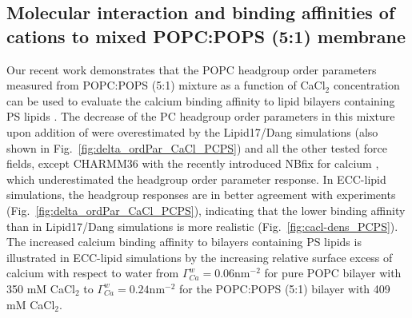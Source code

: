 \documentclass[journal=jpcbfk,manuscript=article]{achemso}
\begin{document}
\subsection{Molecular interaction and binding affinities of  cations to mixed POPC:POPS (5:1) membrane} 
\label{section:lip-ion_ca}

Our recent work demonstrates that the POPC headgroup order parameters measured
from POPC:POPS (5:1) mixture as a function of CaCl$_2$ concentration \cite{roux90}
can be used to evaluate the calcium binding affinity to lipid bilayers containing PS lipids \cite{NMRlipidsIV}.
The decrease of the PC headgroup order parameters in this mixture upon addition of  
were overestimated by the Lipid17/Dang simulations (also shown in Fig.~\ref{fig:delta_ordPar_CaCl_PCPS})
and all the other tested force fields, except CHARMM36 with the recently introduced NBfix for calcium \cite{kim16},
which underestimated the headgroup order parameter response.
In ECC-lipid simulations, the headgroup responses are in better agreement with experiments (Fig.~\ref{fig:delta_ordPar_CaCl_PCPS}),
indicating that the lower binding affinity than in Lipid17/Dang simulations is more realistic (Fig.~\ref{fig:cacl-dens_PCPS}).
The increased calcium binding affinity to bilayers containing PS lipids is illustrated in
ECC-lipid simulations by the increasing relative surface excess of calcium with respect to water from
$\Gamma^{w}_{Ca} = 0.06\mathrm{nm^{-2}}$ for pure POPC bilayer with 350 mM CaCl$_2$ \cite{melcr18}
to $\Gamma^{w}_{Ca} = 0.24\mathrm{nm^{-2}}$ for the POPC:POPS (5:1) bilayer with 409 mM CaCl$_2$.

\end{document}

